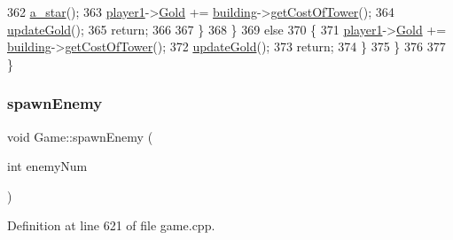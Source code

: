 \begin{DoxyCode}
362                 \hyperlink{class_game_aa3d45b075393d6751f77db3ce31ab9ba}{a\_star}();
363                 \hyperlink{class_game_ad8a7cc146f99c7ec5b7c3c25d73f118c}{player1}->\hyperlink{class_player1_ab390478b345e443398bac442a04b675c}{Gold} += \hyperlink{class_game_a5917b4e021a93be7666ebc2ef4529401}{building}->\hyperlink{class_tower_ae1d3f44d0149c8146ccf6b262a52ddad}{getCostOfTower}();
364                 \hyperlink{class_game_a065998f7609f63e2987ede928359595a}{updateGold}();
365                 \textcolor{keywordflow}{return};
366 
367             \}
368         \}
369         \textcolor{keywordflow}{else}
370         \{
371             \hyperlink{class_game_ad8a7cc146f99c7ec5b7c3c25d73f118c}{player1}->\hyperlink{class_player1_ab390478b345e443398bac442a04b675c}{Gold} += \hyperlink{class_game_a5917b4e021a93be7666ebc2ef4529401}{building}->\hyperlink{class_tower_ae1d3f44d0149c8146ccf6b262a52ddad}{getCostOfTower}();
372             \hyperlink{class_game_a065998f7609f63e2987ede928359595a}{updateGold}();
373             \textcolor{keywordflow}{return};
374         \}
375     \}
376 
377 \}
\end{DoxyCode}
\mbox{\label{class_game_a2c06f08e42cb8ef918596edd11ee00d1}} 
\subsubsection{\texorpdfstring{spawn\+Enemy}{spawnEnemy}\hspace{0.1cm}{\footnotesize\ttfamily [1/2]}}
{\footnotesize\ttfamily void Game\+::spawn\+Enemy (\begin{DoxyParamCaption}\item[{int}]{enemy\+Num }\end{DoxyParamCaption})\hspace{0.3cm}{\ttfamily [slot]}}



Definition at line 621 of file game.\+cpp.


